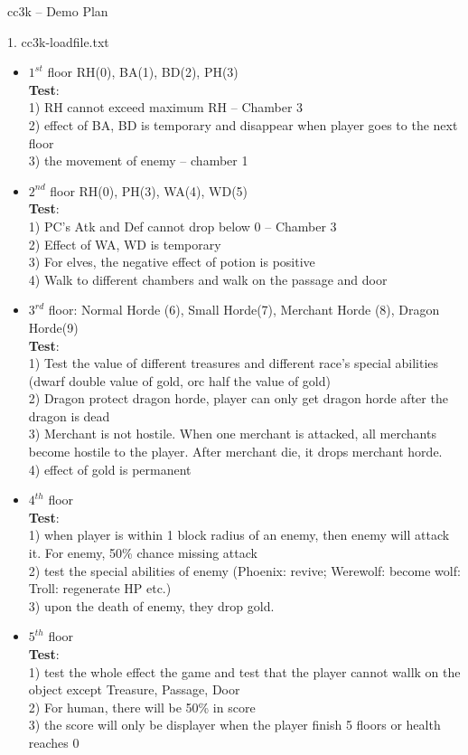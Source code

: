 \documentclass{article}
\begin{document}
\begin {center}
cc3k -- Demo Plan
\end {center}
1. cc3k-loadfile.txt
\begin {itemize}
\item $1^{st}$ floor 
RH(0), BA(1), BD(2), PH(3)\\
\textbf{Test}:\\
1) RH cannot exceed maximum RH -- Chamber 3\\
2) effect of BA, BD is temporary and disappear when player goes to the next floor\\
3) the movement of enemy -- chamber 1
\item $2^{nd}$ floor RH(0), PH(3), WA(4), WD(5)\\
\textbf{Test}:\\
1) PC's Atk and Def cannot drop below 0 -- Chamber 3\\
2) Effect of WA, WD is temporary\\
3) For elves, the negative effect of potion is positive\\
4) Walk to different chambers and walk on the passage and door
\item $3^{rd}$ floor: Normal Horde (6), Small Horde(7), Merchant Horde (8), Dragon Horde(9)\\
\textbf{Test}:\\
1) Test the value of different treasures and different race's special abilities (dwarf double value of gold, orc half the value of gold)\\
2) Dragon protect dragon horde, player can only get dragon horde after the dragon is dead\\
3) Merchant is not hostile. When one merchant is attacked, all merchants become hostile to the player. After merchant die, it drops merchant horde.\\
4) effect of gold is permanent
\item $4^{th}$ floor\\
\textbf{Test}:\\
1) when player is within 1 block radius of an enemy, then enemy will attack it. For enemy, 50\% chance missing attack\\
2) test the special abilities of enemy (Phoenix: revive; Werewolf: become wolf: Troll: regenerate HP etc.)\\
3) upon the death of enemy, they drop gold.

\item $5^{th}$ floor\\
\textbf{Test}:\\
1) test the whole effect the game and test that the player cannot wallk on the object except Treasure, Passage, Door\\
2) For human, there will be 50\% in score\\
3) the score will only be displayer when the player finish 5 floors or health reaches 0

\end {itemize}
\end{document}

